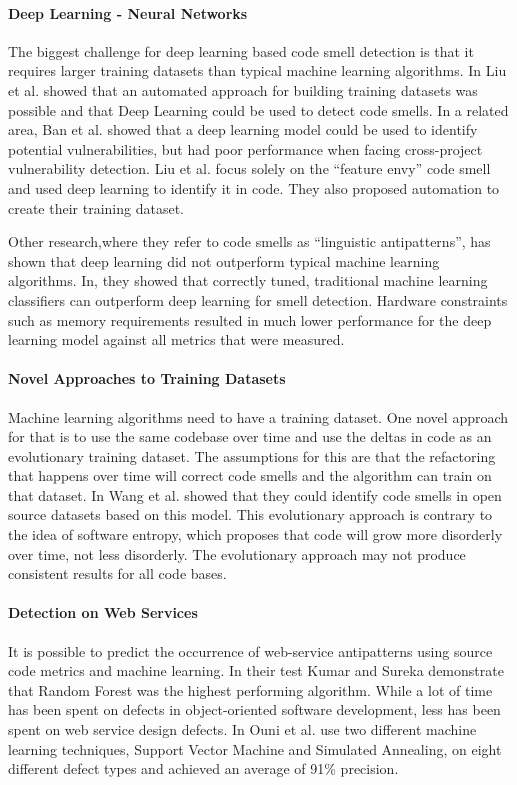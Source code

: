 \documentclass[conference]{IEEEtran}
\begin{document}
\paragraph{Deep Learning - Neural Networks} The biggest challenge for deep learning based code smell detection\cite{liu_deep_2019} is that it requires larger training datasets than typical machine learning algorithms. In \cite{liu_deep_2019} Liu et al. showed that an automated approach for building training datasets was possible and that Deep Learning could be used to detect code smells.
In a related area, Ban et al. showed that a deep learning model could be used to identify potential vulnerabilities\cite{ban_performance_2019}, but had poor performance when facing cross-project vulnerability detection.
Liu et al. focus solely on the ``feature envy'' code smell and used deep learning to identify it in code. They also proposed automation to create their training dataset.

Other research\cite{fakhoury_keep_2018},where they refer to code smells as ``linguistic antipatterns'', has shown that deep learning did not outperform typical machine learning algorithms. In\cite{fakhoury_keep_2018}, they showed that correctly tuned, traditional machine learning classifiers can outperform deep learning for smell detection. Hardware constraints such as memory requirements resulted in much lower performance for the deep learning model against all metrics that were measured. 

\paragraph{Novel Approaches to Training Datasets}
Machine learning algorithms need to have a training dataset. One novel approach for that is to use the same codebase over time and use the deltas in code as an evolutionary training dataset\cite{wang_using_2018}. The assumptions for this are that the refactoring that happens over time will correct code smells and the algorithm can train on that dataset. In\cite{wang_using_2018} Wang et al. showed that they could identify code smells in open source datasets based on this model.
This evolutionary approach is contrary to the idea of software entropy\cite{gupta_software_2018}, which proposes that code will grow more disorderly over time, not less disorderly. The evolutionary approach may not produce consistent results for all code bases.

\paragraph{Detection on Web Services}
It is possible to predict the occurrence of web-service antipatterns using source code metrics and machine learning\cite{kumar_empirical_2018}. In their test Kumar and Sureka demonstrate that Random Forest was the highest performing algorithm. While a lot of time has been spent on defects in object-oriented software development, less has been spent on web service design defects\cite{ouni_machine_2017}. In\cite{ouni_machine_2017} Ouni et al. use two different machine learning techniques, Support Vector Machine and Simulated Annealing, on eight different defect types and achieved an average of 91\% precision.
\end{document}
